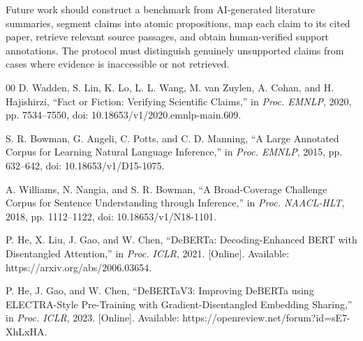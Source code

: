 \documentclass[conference]{IEEEtran}
\begin{document}
Future work should construct a benchmark from AI-generated literature summaries, segment claims into atomic propositions, map each claim to its cited paper, retrieve relevant source passages, and obtain human-verified support annotations. The protocol must distinguish genuinely unsupported claims from cases where evidence is inaccessible or not retrieved.

\begin{thebibliography}{00}
 D. Wadden, S. Lin, K. Lo, L. L. Wang, M. van Zuylen, A. Cohan, and H. Hajishirzi, ``Fact or Fiction: Verifying Scientific Claims,'' in \emph{Proc. EMNLP}, 2020, pp. 7534--7550, doi: 10.18653/v1/2020.emnlp-main.609.

 S. R. Bowman, G. Angeli, C. Potts, and C. D. Manning, ``A Large Annotated Corpus for Learning Natural Language Inference,'' in \emph{Proc. EMNLP}, 2015, pp. 632--642, doi: 10.18653/v1/D15-1075.

 A. Williams, N. Nangia, and S. R. Bowman, ``A Broad-Coverage Challenge Corpus for Sentence Understanding through Inference,'' in \emph{Proc. NAACL-HLT}, 2018, pp. 1112--1122, doi: 10.18653/v1/N18-1101.

 P. He, X. Liu, J. Gao, and W. Chen, ``DeBERTa: Decoding-Enhanced BERT with Disentangled Attention,'' in \emph{Proc. ICLR}, 2021. [Online]. Available: https://arxiv.org/abs/2006.03654.

 P. He, J. Gao, and W. Chen, ``DeBERTaV3: Improving DeBERTa using ELECTRA-Style Pre-Training with Gradient-Disentangled Embedding Sharing,'' in \emph{Proc. ICLR}, 2023. [Online]. Available: https://openreview.net/forum?id=sE7-XhLxHA.
\end{thebibliography}
\end{document}
